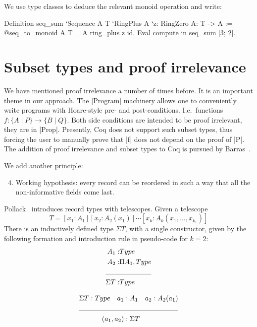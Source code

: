 \documentclass[a4paper,10pt, runningheads]{llncs}
\begin{document}
We use type classes to deduce the relevant monoid operation and write:
\begin{code}
Definition seq_sum
  `{Sequence A T} `{RingPlus A} `{z: RingZero A}: T -> A
  := @seq_to_monoid A T _ A ring_plus z id.
  Eval compute in seq_sum [3; 2].
\end{code}

\section{Subset types and proof irrelevance}
We have mentioned proof irrelevance a number of times before. It is an important theme in our
approach. The |Program| machinery allows one to conveniently write programs with Hoare-style
pre-
and post-conditions. I.e.\ functions $f: \{ A \mid P \} \to \{ B \mid Q \}$. Both side conditions
are intended to be proof irrelevant, they are in |Prop|. Presently, Coq does not support such subset
types, thus forcing the user to manually prove that |f| does not depend on the proof of |P|.
The addition of proof irrelevance and subset types to Coq is pursued by
Barras~\cite{Barras:subset,Werner}. 


We add another principle:
\begin{enumerate}\setcounter{enumi}{3}
 \item Working hypothesis: every record can be reordered in such a way that all the non-informative
fields come last.
\end{enumerate}

Pollack~\cite{pollack2000dependently} introduces record types with telescopes. 
Given a telescope\[
T=[x_1:A_1][x_2:A_2(x_1)]\cdots[x_k:A_k(x_1,\ldots,x_{k_1})]
\]
There is an inductively defined type $\Sigma T$, with a single constructor, given by the following 
formation and introduction rule in pseudo-code for $k=2$:
\begin{align*}
 A_1 :& Type\\
 A_2 :& \Pi A_1,Type\\
\cline{1-2}
\Sigma T :& Type
\end{align*}

\begin{align*}
 \Sigma T:Type\quad a_1 &:A_1 \quad a_2 : A_2(a_1)\\
\cline{1-3}
(a_1,a_2) &:\Sigma T
\end{align*}
\end{document}
